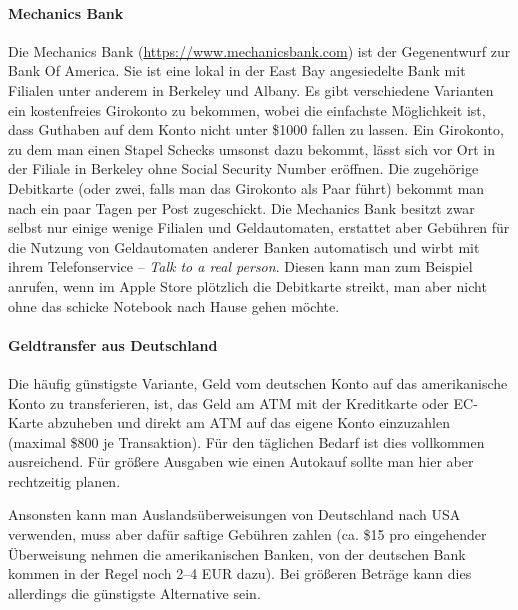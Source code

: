 \documentclass[a4paper]{scrreprt}
\begin{document}
\paragraph{Mechanics Bank}
Die Mechanics Bank (\url{https://www.mechanicsbank.com}) ist der
Gegenentwurf zur Bank Of America. Sie ist eine lokal in der East Bay
angesiedelte Bank mit Filialen unter anderem in Berkeley und
Albany. Es gibt verschiedene Varianten ein kostenfreies Girokonto zu
bekommen, wobei die einfachste Möglichkeit ist, dass Guthaben auf dem
Konto nicht unter \$1000 fallen zu lassen. Ein Girokonto, zu dem man
einen Stapel Schecks umsonst dazu bekommt, lässt sich vor Ort in der
Filiale in Berkeley ohne Social Security Number eröffnen. Die
zugehörige Debitkarte (oder zwei, falls man das Girokonto als Paar
führt) bekommt man nach ein paar Tagen per Post zugeschickt. Die
Mechanics Bank besitzt zwar selbst nur einige wenige Filialen und
Geldautomaten, erstattet aber Gebühren für die Nutzung von
Geldautomaten anderer Banken automatisch und wirbt mit ihrem
Telefonservice -- \emph{Talk to a real person}. Diesen kann man zum
Beispiel anrufen, wenn im Apple Store plötzlich die Debitkarte
streikt, man aber nicht ohne das schicke Notebook nach Hause gehen
möchte. 
%

\paragraph{Geldtransfer aus Deutschland}

Die häufig günstigste Variante, Geld vom deutschen Konto auf das amerikanische Konto zu transferieren, ist, das Geld am ATM mit der Kreditkarte oder EC-Karte abzuheben und direkt am ATM auf das eigene Konto einzuzahlen (maximal \$800 je Transaktion). Für den täglichen Bedarf ist dies vollkommen ausreichend. Für größere Ausgaben wie einen Autokauf sollte man hier aber rechtzeitig planen.

Ansonsten kann man Auslandsüberweisungen von Deutschland nach USA verwenden, muss aber dafür saftige Gebühren zahlen (ca. \$15 pro eingehender Überweisung nehmen die amerikanischen Banken, von der deutschen Bank kommen in der Regel noch 2--4 EUR dazu). Bei größeren Beträge kann dies allerdings die günstigste Alternative sein.
\end{document}
